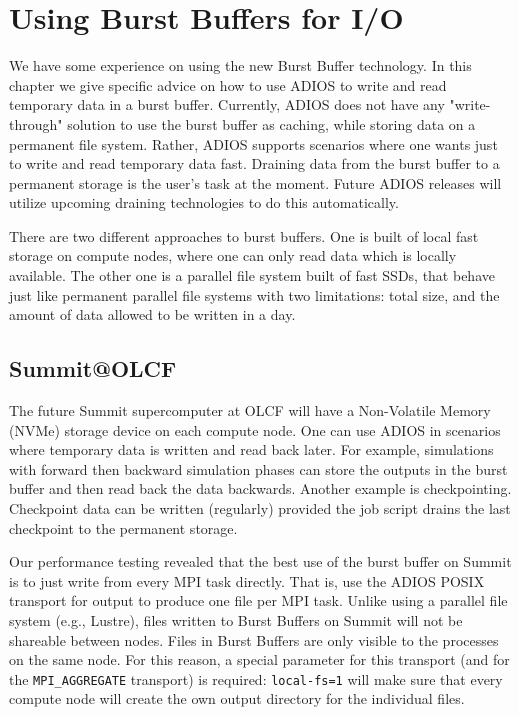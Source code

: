 \chapter{Using Burst Buffers for I/O}
\label{chapter-bb}

We have some experience on using the new Burst Buffer technology. In this chapter we give specific advice on how to use ADIOS to write and read temporary data in a burst buffer. Currently, ADIOS does not have any "write-through" solution to use the burst buffer as caching, while storing data on a permanent file system. Rather, ADIOS supports scenarios where one wants just to write and read temporary data fast. Draining data from the burst buffer to a permanent storage is the user's task at the moment. Future ADIOS releases will utilize upcoming draining technologies to do this automatically. 

There are two different approaches to burst buffers. One is built of local fast storage on compute nodes, where one can only read data which is locally available. The other one is a parallel file system built of fast SSDs, that behave just like permanent parallel file systems with two limitations: total size, and the amount of data allowed to be written in a day. 

\section{Summit@OLCF}

The future Summit supercomputer at OLCF will have a Non-Volatile Memory (NVMe) storage device on each compute node. One can use ADIOS in scenarios where temporary data is written and read back later. For example, simulations with forward then backward simulation phases can store the outputs in the burst buffer and then read back the data backwards. Another example is checkpointing. Checkpoint data can be written (regularly) provided the job script drains the last checkpoint to the permanent storage. 

Our performance testing revealed that the best use of the burst buffer on Summit is to just write from every MPI task directly. That is, use the ADIOS POSIX transport for output to produce one file per MPI task. Unlike using a parallel file system (e.g., Lustre), files written to Burst Buffers on Summit will not be shareable between nodes. Files in Burst Buffers are only visible to the processes on the same node. For this reason, a special parameter for this transport (and for the \verb+MPI_AGGREGATE+ transport) is required: \verb+local-fs=1+ will make sure that every compute node will create the own output directory for the individual files. 


